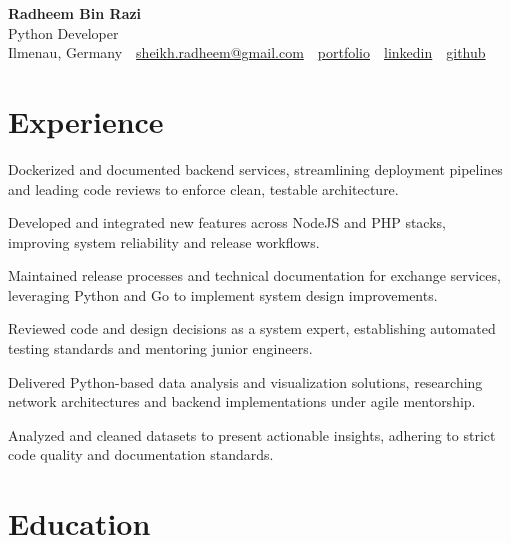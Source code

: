 \documentclass[11pt,a4paper]{resume}
\makeatletter
\newcommand{\Portfolio}{https://radheem.github.io/my-cv}
\newcommand{\PortfolioText}{portfolio}
\newcommand{\GitHub}{https://github.com/radheem}
\newcommand{\LinkedIn}{https://www.linkedin.com/in/radheem-razi}
\newcommand{\Email}{sheikh.radheem@gmail.com}
\makeatother
\begin{document}
\begin{center}
  {\huge\bfseries Radheem Bin Razi}\\[3pt]
  {\large Python Developer}\\[6pt]
  \small
  Ilmenau, Germany \,\textbar\,
  \href{mailto:\Email}{\Email} \,\textbar\,
  \href{\Portfolio}{\PortfolioText} \,\textbar\,
  \href{\LinkedIn}{linkedin} \,\textbar\,
  \href{\GitHub}{github}
\end{center}
\vspace{2pt}

\section{Experience}

\bullets
  \item Dockerized and documented backend services, streamlining deployment pipelines and leading code reviews to enforce clean, testable architecture.
  \item Developed and integrated new features across NodeJS and PHP stacks, improving system reliability and release workflows.
\bulletsend
\vspace{3pt}
\bullets
  \item Maintained release processes and technical documentation for exchange services, leveraging Python and Go to implement system design improvements.
  \item Reviewed code and design decisions as a system expert, establishing automated testing standards and mentoring junior engineers.
\bulletsend
\vspace{3pt}
\bullets
  \item Delivered Python-based data analysis and visualization solutions, researching network architectures and backend implementations under agile mentorship.
  \item Analyzed and cleaned datasets to present actionable insights, adhering to strict code quality and documentation standards.
\bulletsend
\vspace{3pt}

\section{Education}
\end{document}

